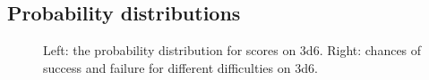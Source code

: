 \documentclass[a4paper,10pt,oneside]{book}
\begin{document}
\begin{appendices}

\chapter{Probability distributions}


\begin{figure}[ht!]
	\centering
	\caption{Left: the probability distribution for scores on 3d6. Right: chances of success and failure for different difficulties on 3d6. } 
\end{figure}

\end{appendices}
\end{document}
